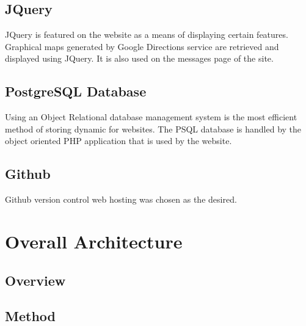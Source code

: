 	\subsection{JQuery}
		JQuery is featured on the website as a means of displaying certain features. Graphical maps generated by Google Directions \cite{google_directions_api} service are retrieved and displayed using JQuery. It is also used on the messages page of the site.	
			
	\subsection{PostgreSQL Database}
	Using an Object Relational database management system is the most efficient method of storing dynamic for websites. The PSQL database is handled by the object oriented PHP application that is used by the website.
	
	\subsection{Github}
		Github \cite{github} version control web hosting was chosen as the desired.
		 
\section{Overall Architecture}
	\subsection{Overview}
	
	\subsection{Method}
